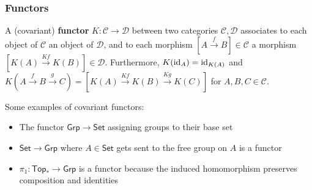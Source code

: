 \documentclass[xcolor=dvipsnames]{beamer}
\begin{document}
    \begin{frame}
        \frametitle{Functors} 
        \begin{definition}[]
            A (covariant) \textbf{functor} $K \colon \mathcal{C}  \to \mathcal{D} $ between two categories $\mathcal{C,D} $ associates to each object of $\mathcal{C} $ an object of $\mathcal{D} $, and to each morphism $[A \xrightarrow{f} B] \in \mathcal{C}$ a morphism $[K(A) \xrightarrow{Kf}K(B)]\in \mathcal{D} $. Furthermore, $K(\operatorname{id}_A)=\operatorname{id}_{K(A)}$ and $K(A \xrightarrow f B \xrightarrow g C)=[K(A) \xrightarrow{Kf} K(B) \xrightarrow{Kg} K(C)]  $ for $A,B,C \in \mathcal{C} $.
        \end{definition}
        \begin{example}
            Some examples of covariant functors:
            \begin{itemize}
                \item The functor $\mathsf{Grp} \to \mathsf{Set} $ assigning groups to their base set
                \item $\mathsf{Set} \to \mathsf{Grp} $ where $A \in \mathsf{Set}  $ gets sent to the free group on $A$ is a functor
                \item $\pi_1 \colon \mathsf{Top}_*  \to \mathsf{Grp}  $ is a functor because the induced homomorphism preserves composition and identities
            \end{itemize}
        \end{example}
    \end{frame}
\end{document}
